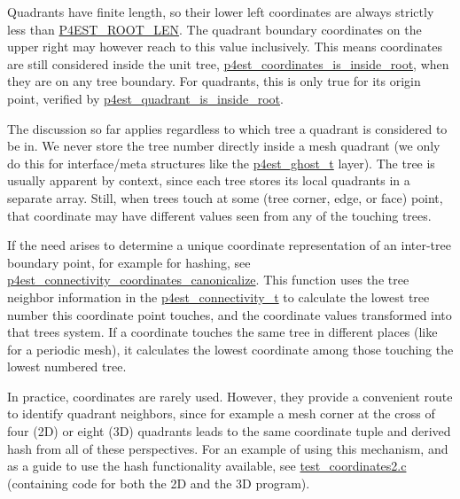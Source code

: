 Quadrants have finite length, so their lower left coordinates are always strictly less than \mbox{\hyperlink{p4est_8h_ae26167f0411d9845caa84be6d50c0cee}{P4\+EST\+\_\+\+ROOT\+\_\+\+LEN}}. The quadrant boundary coordinates on the upper right may however reach to this value inclusively. This means coordinates are still considered inside the unit tree, \mbox{\hyperlink{p4est__bits_8h_a718799d86f590417fab1ccba78c6b3b8}{p4est\+\_\+coordinates\+\_\+is\+\_\+inside\+\_\+root}}, when they are on any tree boundary. For quadrants, this is only true for its origin point, verified by \mbox{\hyperlink{p4est__bits_8h_ab8f88e83d54ea09df2a0d5da476f25e0}{p4est\+\_\+quadrant\+\_\+is\+\_\+inside\+\_\+root}}.

The discussion so far applies regardless to which tree a quadrant is considered to be in. We never store the tree number directly inside a mesh quadrant (we only do this for interface/meta structures like the \mbox{\hyperlink{p4est__ghost_8h_aaa1000659b80aeb802788aac34dcbf5c}{p4est\+\_\+ghost\+\_\+t}} layer). The tree is usually apparent by context, since each tree stores its local quadrants in a separate array. Still, when trees touch at some (tree corner, edge, or face) point, that coordinate may have different values seen from any of the touching trees.

If the need arises to determine a unique coordinate representation of an inter-\/tree boundary point, for example for hashing, see \mbox{\hyperlink{p4est__connectivity_8h_a35a4816ff10305a61d0e749ec9888a6d}{p4est\+\_\+connectivity\+\_\+coordinates\+\_\+canonicalize}}. This function uses the tree neighbor information in the \mbox{\hyperlink{p4est__connectivity_8h_a7bfc76825a73a3764b063ef476ed62f3}{p4est\+\_\+connectivity\+\_\+t}} to calculate the lowest tree number this coordinate point touches, and the coordinate values transformed into that tree\textquotesingle{}s system. If a coordinate touches the same tree in different places (like for a periodic mesh), it calculates the lowest coordinate among those touching the lowest numbered tree.

In practice, coordinates are rarely used. However, they provide a convenient route to identify quadrant neighbors, since for example a mesh corner at the cross of four (2D) or eight (3D) quadrants leads to the same coordinate tuple and derived hash from all of these perspectives. For an example of using this mechanism, and as a guide to use the hash functionality available, see \mbox{\hyperlink{test_coordinates2_8c-example}{test\+\_\+coordinates2.\+c}} (containing code for both the 2D and the 3D program). 